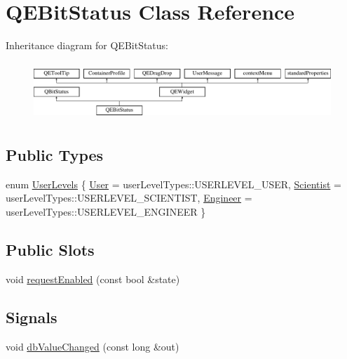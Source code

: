 \hypertarget{classQEBitStatus}{
\section{QEBitStatus Class Reference}
\label{classQEBitStatus}
}
Inheritance diagram for QEBitStatus:\begin{figure}[H]
\begin{center}
\leavevmode
\includegraphics[height=2.204725cm]{classQEBitStatus}
\end{center}
\end{figure}
\subsection*{Public Types}
\begin{DoxyCompactItemize}
\item 
enum \hyperlink{classQEBitStatus_a3b7b2b21622eff585577c6ab1b90b5ed}{UserLevels} \{ \hyperlink{classQEBitStatus_a3b7b2b21622eff585577c6ab1b90b5edac90ba0a8e50d171ace05c3e658b22c5f}{User} =  userLevelTypes::USERLEVEL\_\-USER, 
\hyperlink{classQEBitStatus_a3b7b2b21622eff585577c6ab1b90b5eda9551f9fd57b4a79a3f0acab100dd54da}{Scientist} =  userLevelTypes::USERLEVEL\_\-SCIENTIST, 
\hyperlink{classQEBitStatus_a3b7b2b21622eff585577c6ab1b90b5edaf8ad93072e055c44cc3ced7198ba000d}{Engineer} =  userLevelTypes::USERLEVEL\_\-ENGINEER
 \}
\end{DoxyCompactItemize}
\subsection*{Public Slots}
\begin{DoxyCompactItemize}
\item 
void \hyperlink{classQEBitStatus_a11bf1b6d20c82350c8c3798f998e6de7}{requestEnabled} (const bool \&state)
\end{DoxyCompactItemize}
\subsection*{Signals}
\begin{DoxyCompactItemize}
\item 
void \hyperlink{classQEBitStatus_a422111caf2507a182cb27bc425e34ea5}{dbValueChanged} (const long \&out)
\end{DoxyCompactItemize}
